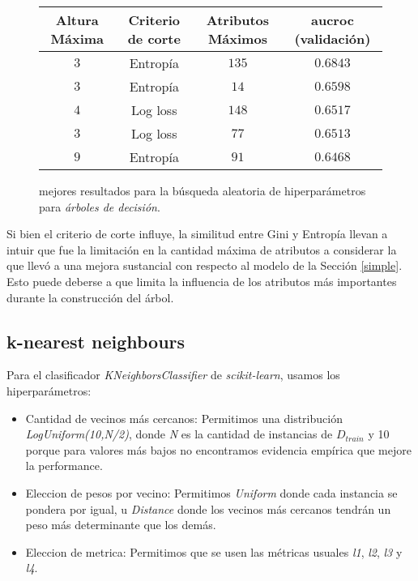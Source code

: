 \vspace{0.5em}
\begin{figure}[!htbp]
    \begin{center}
        \begin{tabular}{ |c|c|c|c| } 
         \hline
        Altura Máxima   & Criterio de corte & Atributos Máximos  & aucroc (validación) \\
        \hline
        $3$             & Entropía          &  $135$            & $0.6843$  \\ 
        $3$             & Entropía          &  $14$             & $0.6598$  \\
        $4$             & Log loss          &  $148$            & $0.6517$  \\ 
        $3$             & Log loss          &  $77$             & $0.6513$  \\
        $9$             & Entropía          &  $91$             & $0.6468$  \\ 
        \hline
        \end{tabular}
    \end{center}
    \caption{mejores resultados para la búsqueda aleatoria de hiperparámetros para \textit{árboles de decisión}.} \label{random_tree}
\end{figure}

Si bien el criterio de corte influye, la similitud entre Gini y Entropía llevan a intuir que fue la limitación en la cantidad máxima de atributos a considerar la que llevó a una mejora sustancial con respecto al modelo de la Sección \ref{simple}. Esto puede deberse a que limita la influencia de los atributos más importantes durante la construcción del árbol.

\subsection{k-nearest neighbours}
Para el clasificador \textit{KNeighborsClassifier} de \textit{scikit-learn}, usamos los hiperparámetros:

\begin{itemize}
    \item Cantidad de vecinos más cercanos: Permitimos una distribución \textit{LogUniform(10,N/2)}, donde \textit{N} es la cantidad de instancias de $D_{train}$ y 10 porque para valores más bajos no encontramos evidencia empírica que mejore la performance. 
    \item Eleccion de pesos por vecino: Permitimos \textit{Uniform} donde cada instancia se pondera por igual, u \textit{Distance} donde los vecinos más cercanos tendrán un peso más determinante que los demás.
    \item Eleccion de metrica: Permitimos que se usen las métricas usuales \textit{l1}, \textit{l2}, \textit{l3} y \textit{l4}. 
\end{itemize}

